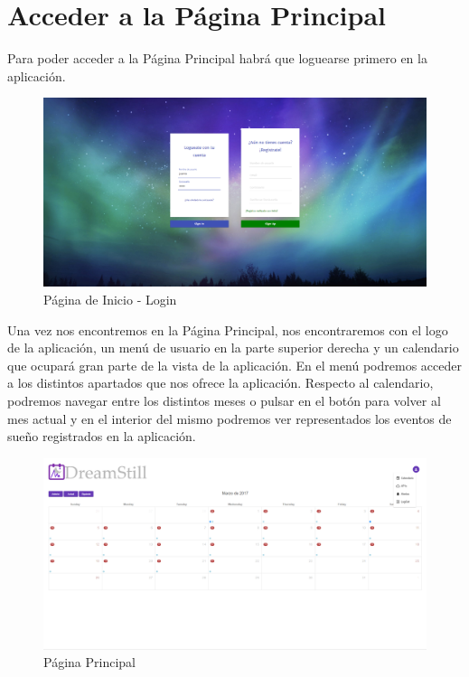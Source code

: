\documentclass[11pt,openany]{book}
\begin{document}
\section{Acceder a la Página Principal}

Para poder acceder a la Página Principal habrá que loguearse primero en la aplicación.

\begin{figure}[H]
\centering
\includegraphics[totalheight=6cm]{manualUsuario/login.png}
\caption{Página de Inicio - Login}
\end{figure}

Una vez nos encontremos en la Página Principal, nos encontraremos con el logo de la aplicación, un menú de usuario en la parte superior derecha y un calendario que ocupará gran parte de la vista de la aplicación. En el menú podremos acceder a los distintos apartados que nos ofrece la aplicación. Respecto al calendario, podremos navegar entre los distintos meses o pulsar en el botón para volver al mes actual y en el interior del mismo podremos ver representados los eventos de sueño registrados en la aplicación. 

\begin{figure}[H]
\centering
\includegraphics[totalheight=6cm]{manualUsuario/paginaPrincipal.png}
\caption{Página Principal}
\end{figure}
\end{document}
